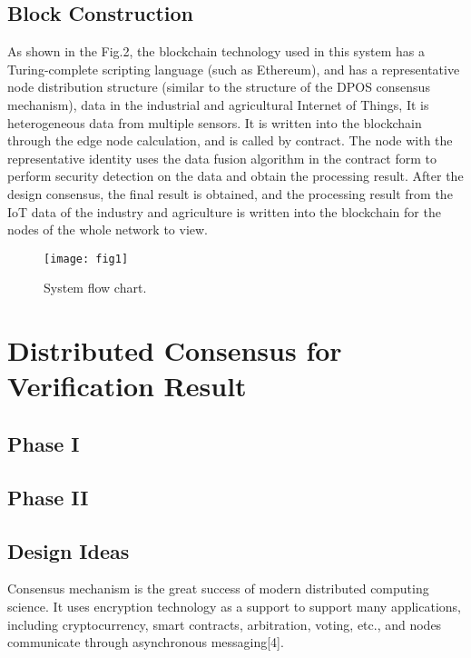 \documentclass{ieeeaccess}
\begin{document}
\subsection{Block Construction}

As shown in the Fig.2, the blockchain technology used in this system has a Turing-complete scripting language (such as Ethereum), and has a representative node distribution structure (similar to the structure of the DPOS consensus mechanism), data in the industrial and agricultural Internet of Things, It is heterogeneous data from multiple sensors. It is written into the blockchain through the edge node calculation, and is called by contract. The node with the representative identity uses the data fusion algorithm in the contract form to perform security detection on the data and obtain the processing result. After the design consensus, the final result is obtained, and the processing result from the IoT data of the industry and agriculture is written into the blockchain for the nodes of the whole network to view.
\begin{figure}[htbp]
\begin{center}
\texttt{[image: fig1]}
\caption{System flow chart.}
\label{f}
\end{center}
\end{figure}

\section{Distributed Consensus for Verification Result}

\subsection{Phase I}

\subsection{Phase II}

\subsection{Design Ideas}
Consensus mechanism is the great success of modern distributed computing science. It uses encryption technology as a support to support many applications, including cryptocurrency, smart contracts, arbitration, voting, etc., and nodes communicate through asynchronous messaging[4].
\end{document}
